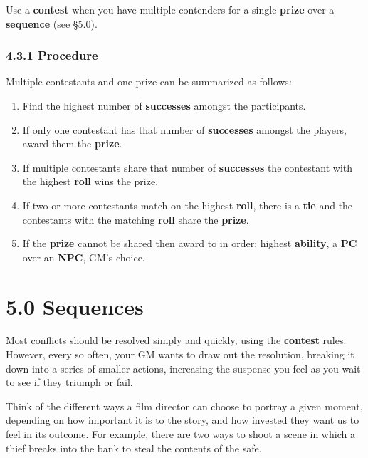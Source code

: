 \documentclass[
  11pt,
]{article}
\providecommand{\tightlist}{%
  \setlength{\itemsep}{0pt}\setlength{\parskip}{0pt}}
\begin{document}
Use a \textbf{contest} when you have multiple contenders for a single
\textbf{prize} over a \textbf{sequence} (see §5.0).

\hypertarget{procedure-2}{%
\subsubsection{4.3.1 Procedure}\label{procedure-2}}

Multiple contestants and one prize can be summarized as follows:

\begin{enumerate}
\def\labelenumi{\arabic{enumi}.}
\tightlist
\item
  Find the highest number of \textbf{successes} amongst the
  participants.
\item
  If only one contestant has that number of \textbf{successes} amongst
  the players, award them the \textbf{prize}.
\item
  If multiple contestants share that number of \textbf{successes} the
  contestant with the highest \textbf{roll} wins the prize.
\item
  If two or more contestants match on the highest \textbf{roll}, there
  is a \textbf{tie} and the contestants with the matching \textbf{roll}
  share the \textbf{prize}.
\item
  If the \textbf{prize} cannot be shared then award to in order: highest
  \textbf{ability}, a \textbf{PC} over an \textbf{NPC}, GM's choice.
\end{enumerate}

\hypertarget{sequences}{%
\section{5.0 Sequences}\label{sequences}}

Most conflicts should be resolved simply and quickly, using the
\textbf{contest} rules. However, every so often, your GM wants to draw
out the resolution, breaking it down into a series of smaller actions,
increasing the suspense you feel as you wait to see if they triumph or
fail.

Think of the different ways a film director can choose to portray a
given moment, depending on how important it is to the story, and how
invested they want us to feel in its outcome. For example, there are two
ways to shoot a scene in which a thief breaks into the bank to steal the
contents of the safe.
\end{document}
